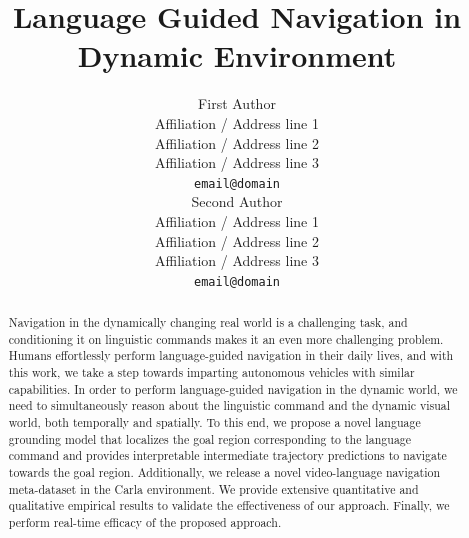 \documentclass[11pt]{article}
\title{Language Guided Navigation in Dynamic Environment}
\author{First Author \\
  Affiliation / Address line 1 \\
  Affiliation / Address line 2 \\
  Affiliation / Address line 3 \\
  \texttt{email@domain} \\\And
  Second Author \\
  Affiliation / Address line 1 \\
  Affiliation / Address line 2 \\
  Affiliation / Address line 3 \\
  \texttt{email@domain} \\}
\begin{document}
\maketitle
\begin{abstract}
 Navigation in the dynamically changing real world is a challenging task, and conditioning it on linguistic commands makes it an even more challenging problem. Humans effortlessly perform language-guided navigation in their daily lives, and with this work, we take a step towards imparting autonomous vehicles with similar capabilities. In order to perform language-guided navigation in the dynamic world, we need to simultaneously reason about the linguistic command and the dynamic visual world, both temporally and spatially. To this end, we propose a novel language grounding model that localizes the goal region corresponding to the language command and provides interpretable intermediate trajectory predictions to navigate towards the goal region. Additionally, we release a novel video-language navigation meta-dataset in the Carla environment. We provide extensive quantitative and qualitative empirical results to validate the effectiveness of our approach. Finally, we perform real-time efficacy of the proposed approach.
\end{abstract}


\end{document}
